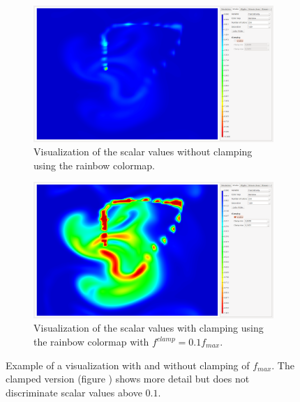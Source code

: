\begin{figure}[tb]
	\centering
	\begin{subfigure}[t]{0.4\textwidth}
		\centering
		\includegraphics[width=\textwidth, trim={35px 30px 430px 30px}, clip]{colormapping/img/notclamped}
		\caption{Visualization of the scalar values without clamping using the rainbow colormap.}
		\label{fig:colormapping:clamped:disabled}
	\end{subfigure}
	\hspace{50px}
	\begin{subfigure}[t]{0.4\textwidth}
		\centering
		\includegraphics[width=\textwidth, trim={35px 30px 430px 30px}, clip]{colormapping/img/clamped_01}
		\caption{Visualization of the scalar values with clamping using the rainbow colormap with $f^{clamp} = 0.1 f_{max}$.}
		\label{fig:colormapping:clamped:enabled}
	\end{subfigure}	
	\caption{Example of a visualization with and without clamping of $f_{max}$. The clamped version (figure ) shows more detail but does not discriminate scalar values above $0.1$.}
	\label{fig:colormapping:clamped}
\end{figure}